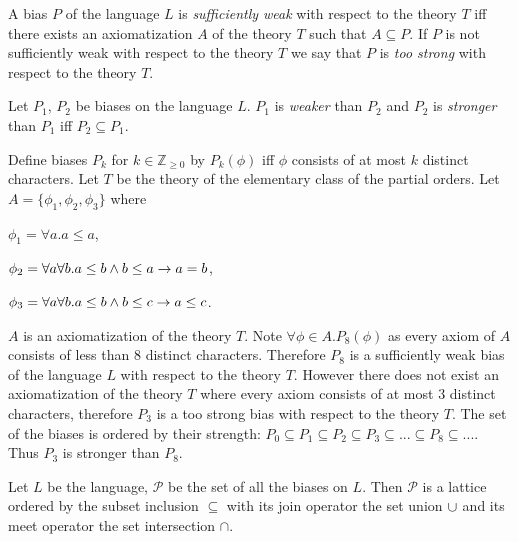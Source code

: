 \begin{defn}
A bias $P$ of the language $L$ is \emph{sufficiently weak} with respect to the theory $T$ iff there exists an axiomatization $A$ of the theory $T$ such that $A \subseteq P$. If $P$ is not sufficiently weak with respect to the theory $T$ we say that $P$ is \emph{too strong} with respect to the theory $T$.
\end{defn}

\begin{defn}
Let $P_1$, $P_2$ be biases on the language $L$. $P_1$ is \emph{weaker} than $P_2$ and $P_2$ is \emph{stronger} than $P_1$ iff $P_2 \subseteq P_1$.
\end{defn}

\begin{exmp}
Define biases $P_k$ for $k \in \mathbb{Z}_{\ge 0}$ by $P_k(\phi)$ iff $\phi$ consists of at most $k$ distinct characters. Let $T$ be the theory of the elementary class of the partial orders. Let $A=\{\phi_1, \phi_2, \phi_3\}$ where

$\phi_1=\forall a. a \le a$,

$\phi_2=\forall a \forall b. a \le b \wedge b \le a \to a=b$,

$\phi_3=\forall a \forall b. a \le b \wedge b \le c \to a \le c$.

$A$ is an axiomatization of the theory $T$. Note $\forall \phi \in A. P_8(\phi)$ as every axiom of $A$ consists of less than $8$ distinct characters. Therefore $P_8$ is a sufficiently weak bias of the language $L$ with respect to the theory $T$. However there does not exist an axiomatization of the theory $T$ where every axiom consists of at most $3$ distinct characters, therefore $P_3$ is a too strong bias with respect to the theory $T$. The set of the biases is ordered by their strength:
$P_0 \subseteq P_1 \subseteq P_2 \subseteq P_3 \subseteq ... \subseteq P_8 \subseteq ...$. Thus $P_3$ is stronger than $P_8$.
\end{exmp}

\begin{remark}
Let $L$ be the language, $\mathcal{P}$ be the set of all the biases on $L$. Then $\mathcal{P}$ is a lattice ordered by the subset inclusion $\subseteq$ with its join operator the set union $\cup$ and its meet operator the set intersection $\cap$.
\end{remark}

